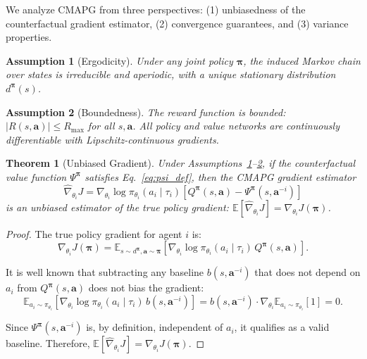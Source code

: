 \documentclass[journal]{IEEEtran}
\newtheorem{theorem}{Theorem}
\newtheorem{assumption}{Assumption}
\newcommand{\EE}{\mathbb{E}}
\begin{document}
We analyze CMAPG from three perspectives: (1) unbiasedness of the counterfactual gradient estimator, (2) convergence guarantees, and (3) variance properties.

\begin{assumption}[Ergodicity]\label{ass:ergodic}
Under any joint policy $\bm{\pi}$, the induced Markov chain over states is irreducible and aperiodic, with a unique stationary distribution $d^{\bm{\pi}}(s)$.
\end{assumption}

\begin{assumption}[Boundedness]\label{ass:bounded}
The reward function is bounded: $|R(s, \mathbf{a})| \leq R_{\max}$ for all $s, \mathbf{a}$. All policy and value networks are continuously differentiable with Lipschitz-continuous gradients.
\end{assumption}

\begin{theorem}[Unbiased Gradient]\label{thm:unbiased}
Under Assumptions~\ref{ass:ergodic}--\ref{ass:bounded}, if the counterfactual value function $\Psi^{\bm{\pi}}$ satisfies Eq.~\eqref{eq:psi_def}, then the CMAPG gradient estimator
\begin{equation}
    \hat{\nabla}_{\theta_i} J = \nabla_{\theta_i} \log \pi_{\theta_i}(a_i \mid \tau_i) \left[Q^{\bm{\pi}}(s, \mathbf{a}) - \Psi^{\bm{\pi}}(s, \mathbf{a}^{-i})\right]
\end{equation}
is an unbiased estimator of the true policy gradient: $\EE[\hat{\nabla}_{\theta_i} J] = \nabla_{\theta_i} J(\bm{\pi})$.
\end{theorem}

\begin{proof}
The true policy gradient for agent $i$ is:
\begin{equation}
    \nabla_{\theta_i} J(\bm{\pi}) = \EE_{s \sim d^{\bm{\pi}}, \mathbf{a} \sim \bm{\pi}}\left[\nabla_{\theta_i} \log \pi_{\theta_i}(a_i \mid \tau_i) \, Q^{\bm{\pi}}(s, \mathbf{a})\right].
\end{equation}

It is well known that subtracting any baseline $b(s, \mathbf{a}^{-i})$ that does not depend on $a_i$ from $Q^{\bm{\pi}}(s, \mathbf{a})$ does not bias the gradient:
\begin{equation}
    \EE_{a_i \sim \pi_{\theta_i}}\left[\nabla_{\theta_i} \log \pi_{\theta_i}(a_i \mid \tau_i) \, b(s, \mathbf{a}^{-i})\right] = b(s, \mathbf{a}^{-i}) \cdot \nabla_{\theta_i} \EE_{a_i \sim \pi_{\theta_i}}[1] = 0.
\end{equation}

Since $\Psi^{\bm{\pi}}(s, \mathbf{a}^{-i})$ is, by definition, independent of $a_i$, it qualifies as a valid baseline. Therefore, $\EE[\hat{\nabla}_{\theta_i} J] = \nabla_{\theta_i} J(\bm{\pi})$.
\end{proof}
\end{document}

